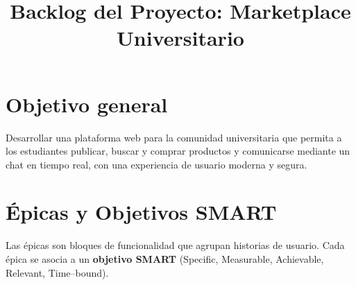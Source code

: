 \documentclass{article}
\begin{document}
\title{Backlog del Proyecto: Marketplace Universitario}
\author{}
\date{}
\maketitle

\section*{Objetivo general}
Desarrollar una plataforma web para la comunidad universitaria que permita a los estudiantes publicar, buscar y comprar productos y comunicarse mediante un chat en tiempo real, con una experiencia de usuario moderna y segura.

\section*{\'{E}picas y Objetivos SMART}
Las \'{e}picas son bloques de funcionalidad que agrupan historias de usuario. Cada \'{e}pica se asocia a un \textbf{objetivo SMART} (Specific, Measurable, Achievable, Relevant, Time--bound).
\end{document}
